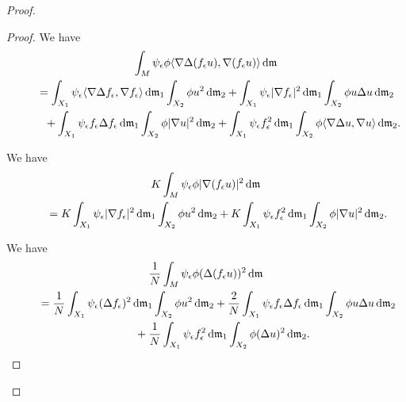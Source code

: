 \documentclass[pdftex]{sigma}
\numberwithin{equation}{section}
\theoremstyle{definition}
\newcommand{\mf}{\mathfrak{m}}
\begin{document}
\begin{proof}
\begin{proof}
We have
\begin{gather}
\int_M \psi_\epsilon \phi\langle\nabla \Delta(f_\epsilon u),\nabla(f_\epsilon u) \rangle\,{\rm d}\mf
\nonumber
\\ \qquad
=\int_{X_1}\psi_\epsilon\langle\nabla \Delta f_\epsilon,\nabla f_\epsilon\rangle\,{\rm d}\mf_1\int_{X_2}\phi u^2\,{\rm d}\mf_2
+\int_{X_1} \psi_\epsilon |\nabla f_\epsilon|^2\,{\rm d}\mf_1\int_{X_2}\phi u\Delta u\,{\rm d}\mf_2
\nonumber
\\  \qquad\quad
{}+\int_{X_1} \psi_\epsilon f_\epsilon \Delta f_\epsilon\,{\rm d}\mf_1\int_{X_2}\phi|\nabla u|^2\,{\rm d}\mf_2
+\int_{X_1} \psi_\epsilon f_\epsilon^2\,{\rm d}\mf_1\int_{X_2}\phi\langle\nabla \Delta u,\nabla u\rangle\,{\rm d}\mf_2.
\label{3c}
\end{gather}

We have
\begin{gather}
K\int_M \psi_\epsilon \phi|\nabla (f_\epsilon u)|^2\,{\rm d}\mf\nonumber
\\ \qquad
{}=K \int_{X_1}\psi_\epsilon|\nabla f_\epsilon|^2\,{\rm d}\mf_1\int_{X_2}\phi u^2\,{\rm d}\mf_2
+K\int_{X_1} \psi_\epsilon f_\epsilon^2\,{\rm d}\mf_1\int_{X_2}\phi |\nabla u|^2\,{\rm d}\mf_2.
\label{3d}
\end{gather}


We have
\begin{gather}
\frac{1}{N}\int_M \psi_\epsilon \phi(\Delta (f_\epsilon u))^2\,{\rm d}\mf
\nonumber
\\ \qquad
{}=\frac{1}{N}\int_{X_1}\psi_\epsilon(\Delta f_\epsilon)^2\,{\rm d}\mf_1\int_{X_2}\phi u^2\,{\rm d}\mf_2
+\frac{2}{N}\int_{X_1} \psi_\epsilon f_\epsilon \Delta f_\epsilon\,{\rm d}\mf_1\int_{X_2}\phi u \Delta u\,{\rm d}\mf_2
\nonumber
\\ \qquad\quad
{}+\frac{1}{N}\int_{X_1} \psi_\epsilon f_\epsilon^2\,{\rm d}\mf_1\int_{X_2}\phi (\Delta u)^2\,{\rm d}\mf_2.
\label{3e}
\end{gather}


\end{proof}
\end{proof}
\end{document}
